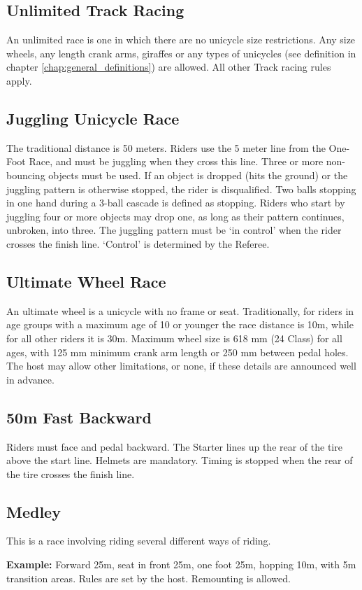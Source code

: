 \subsection{Unlimited Track Racing}

An unlimited race is one in which there are no unicycle size restrictions.
Any size wheels, any length crank arms, giraffes or any types of unicycles (see definition in chapter \ref{chap:general_definitions}) are allowed.
All other Track racing rules apply.

\subsection{Juggling Unicycle Race}

The traditional distance is 50 meters.
Riders use the 5 meter line from the One-Foot Race, and must be juggling when they cross this line.
Three or more non-bouncing objects must be used.
If an object is dropped (hits the ground) or the juggling pattern is otherwise stopped, the rider is disqualified.
Two balls stopping in one hand during a 3-ball cascade is defined as stopping.
Riders who start by juggling four or more objects may drop one, as long as their pattern continues, unbroken, into three.
The juggling pattern must be `in control' when the rider crosses the finish line.
`Control' is determined by the Referee.

\subsection{Ultimate Wheel Race}

An ultimate wheel is a unicycle with no frame or seat.
Traditionally, for riders in age groups with a maximum age of 10 or younger the race distance is 10m, while for all other riders it is 30m.
Maximum wheel size is 618 mm (24 Class) for all ages, with 125 mm minimum crank arm length or 250 mm between pedal holes.
The host may allow other limitations, or none, if these details are announced well in advance.


\subsection{50m Fast Backward}

Riders must face and pedal backward.
The Starter lines up the rear of the tire above the start line.
Helmets are mandatory.
Timing is stopped when the rear of the tire crosses the finish line.

\subsection{Medley}

This is a race involving riding several different ways of riding.

\textbf{Example:} Forward 25m, seat in front 25m, one foot 25m, hopping 10m, with 5m transition areas.
Rules are set by the host.
Remounting is allowed.

